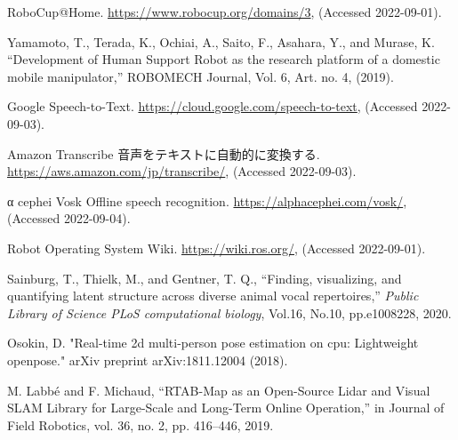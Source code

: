 \documentclass[a4j]{jarticle}
\begin{document}
\begin{thebibliography}{99}

RoboCup@Home. \url{https://www.robocup.org/domains/3}, (Accessed 2022-09-01).

Yamamoto, T., Terada, K., Ochiai, A., Saito, F., Asahara, Y., and Murase, K. “Development of Human Support Robot as the research platform of a domestic mobile manipulator,” ROBOMECH Journal, Vol. 6, Art. no. 4, (2019).




Google Speech-to-Text. \url{https://cloud.google.com/speech-to-text}, (Accessed 2022-09-03).

Amazon Transcribe 音声をテキストに自動的に変換する. \url{https://aws.amazon.com/jp/transcribe/}, (Accessed 2022-09-03).

α cephei Vosk Offline speech recognition. \url{https://alphacephei.com/vosk/}, (Accessed 2022-09-04).

Robot Operating System Wiki. \url{https://wiki.ros.org/}, (Accessed 2022-09-01).

Sainburg, T., Thielk, M., and Gentner, T. Q.,
“Finding, visualizing, and quantifying latent structure across diverse animal vocal repertoires,”
{\it Public Library of Science PLoS computational biology},
Vol.16,
No.10,
pp.e1008228,
2020.

Osokin, D. "Real-time 2d multi-person pose estimation on cpu: Lightweight openpose." arXiv preprint arXiv:1811.12004 (2018).

M. Labbé and F. Michaud, “RTAB-Map as an Open-Source Lidar and Visual SLAM Library for Large-Scale and Long-Term Online Operation,” in Journal of Field Robotics, vol. 36, no. 2, pp. 416–446, 2019.


\end{thebibliography}
\end{document}
